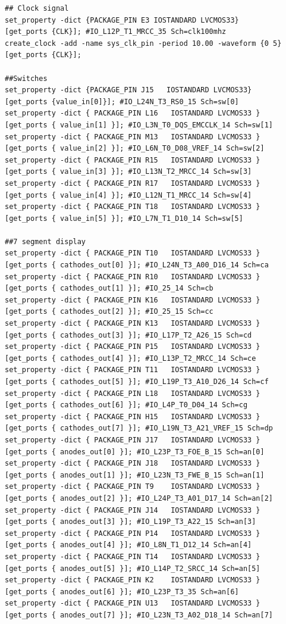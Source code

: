 {\footnotesize
\begin{verbatim}
## Clock signal
set_property -dict {PACKAGE_PIN E3 IOSTANDARD LVCMOS33}
[get_ports {CLK}]; #IO_L12P_T1_MRCC_35 Sch=clk100mhz
create_clock -add -name sys_clk_pin -period 10.00 -waveform {0 5} 
[get_ports {CLK}];

##Switches
set_property -dict {PACKAGE_PIN J15   IOSTANDARD LVCMOS33} 
[get_ports {value_in[0]}]; #IO_L24N_T3_RS0_15 Sch=sw[0]
set_property -dict { PACKAGE_PIN L16   IOSTANDARD LVCMOS33 } 
[get_ports { value_in[1] }]; #IO_L3N_T0_DQS_EMCCLK_14 Sch=sw[1]
set_property -dict { PACKAGE_PIN M13   IOSTANDARD LVCMOS33 } 
[get_ports { value_in[2] }]; #IO_L6N_T0_D08_VREF_14 Sch=sw[2]
set_property -dict { PACKAGE_PIN R15   IOSTANDARD LVCMOS33 } 
[get_ports { value_in[3] }]; #IO_L13N_T2_MRCC_14 Sch=sw[3]
set_property -dict { PACKAGE_PIN R17   IOSTANDARD LVCMOS33 } 
[get_ports { value_in[4] }]; #IO_L12N_T1_MRCC_14 Sch=sw[4]
set_property -dict { PACKAGE_PIN T18   IOSTANDARD LVCMOS33 } 
[get_ports { value_in[5] }]; #IO_L7N_T1_D10_14 Sch=sw[5]

##7 segment display
set_property -dict { PACKAGE_PIN T10   IOSTANDARD LVCMOS33 } 
[get_ports { cathodes_out[0] }]; #IO_L24N_T3_A00_D16_14 Sch=ca
set_property -dict { PACKAGE_PIN R10   IOSTANDARD LVCMOS33 } 
[get_ports { cathodes_out[1] }]; #IO_25_14 Sch=cb
set_property -dict { PACKAGE_PIN K16   IOSTANDARD LVCMOS33 } 
[get_ports { cathodes_out[2] }]; #IO_25_15 Sch=cc
set_property -dict { PACKAGE_PIN K13   IOSTANDARD LVCMOS33 } 
[get_ports { cathodes_out[3] }]; #IO_L17P_T2_A26_15 Sch=cd
set_property -dict { PACKAGE_PIN P15   IOSTANDARD LVCMOS33 } 
[get_ports { cathodes_out[4] }]; #IO_L13P_T2_MRCC_14 Sch=ce
set_property -dict { PACKAGE_PIN T11   IOSTANDARD LVCMOS33 } 
[get_ports { cathodes_out[5] }]; #IO_L19P_T3_A10_D26_14 Sch=cf
set_property -dict { PACKAGE_PIN L18   IOSTANDARD LVCMOS33 } 
[get_ports { cathodes_out[6] }]; #IO_L4P_T0_D04_14 Sch=cg
set_property -dict { PACKAGE_PIN H15   IOSTANDARD LVCMOS33 } 
[get_ports { cathodes_out[7] }]; #IO_L19N_T3_A21_VREF_15 Sch=dp
set_property -dict { PACKAGE_PIN J17   IOSTANDARD LVCMOS33 } 
[get_ports { anodes_out[0] }]; #IO_L23P_T3_FOE_B_15 Sch=an[0]
set_property -dict { PACKAGE_PIN J18   IOSTANDARD LVCMOS33 } 
[get_ports { anodes_out[1] }]; #IO_L23N_T3_FWE_B_15 Sch=an[1]
set_property -dict { PACKAGE_PIN T9    IOSTANDARD LVCMOS33 } 
[get_ports { anodes_out[2] }]; #IO_L24P_T3_A01_D17_14 Sch=an[2]
set_property -dict { PACKAGE_PIN J14   IOSTANDARD LVCMOS33 } 
[get_ports { anodes_out[3] }]; #IO_L19P_T3_A22_15 Sch=an[3]
set_property -dict { PACKAGE_PIN P14   IOSTANDARD LVCMOS33 } 
[get_ports { anodes_out[4] }]; #IO_L8N_T1_D12_14 Sch=an[4]
set_property -dict { PACKAGE_PIN T14   IOSTANDARD LVCMOS33 } 
[get_ports { anodes_out[5] }]; #IO_L14P_T2_SRCC_14 Sch=an[5]
set_property -dict { PACKAGE_PIN K2    IOSTANDARD LVCMOS33 } 
[get_ports { anodes_out[6] }]; #IO_L23P_T3_35 Sch=an[6]
set_property -dict { PACKAGE_PIN U13   IOSTANDARD LVCMOS33 } 
[get_ports { anodes_out[7] }]; #IO_L23N_T3_A02_D18_14 Sch=an[7]


\end{verbatim}}

